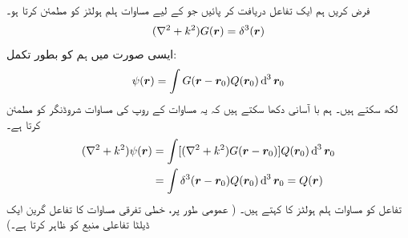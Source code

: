 فرض کریں ہم ایک تفاعل  دریافت کر پائیں جو   کے لیے مساوات ہلم ہولٹز کو مطمئن کرتا ہو۔
\begin{align}\label{مساوات_بکھراو_ہلم_ہولٹز_ڈلٹا}
	(\nabla^2+k^2)G({{\boldsymbol{r}}})=\delta^3({{\boldsymbol{r}}})
\end{align}
ایسی صورت میں ہم  کو بطور تکمل:
\begin{align}\label{مساوات_بکھراو_سائے_بطور_تکمل}
	\psi(\kvec{r})=\int G(\kvec{r}-\kvec{r}_0)Q(\kvec{r}_0)\dif^{\,3}\kvec{r}_0
\end{align}
 لکھ سکتے ہیں۔ ہم با آسانی دکھا سکتے ہیں کہ یہ مساوات  کے روپ کی مساوات شروڈنگر کو مطمئن کرتا ہے۔
\begin{align*}
(\nabla^2+k^2)\psi(\kvec{r}) &= \int[(\nabla^2+k^2)G(\kvec{r}-\kvec{r}_0)]Q(\kvec{r}_0)\dif^{\,3}\kvec{r}_0 \\
	&= \int\delta^3(\kvec{r}-\kvec{r}_0)Q(\kvec{r}_0)\dif^{\,3}\kvec{r}_0 = Q(\kvec{r})
\end{align*}
تفاعل  کو مساوات ہلم ہولٹز کا  کہتے ہیں۔ ( عمومی طور پر، خطی تفرقی مساوات کا تفاعل گرین ایک ڈیلٹا تفاعلی منبع کو  ظاہر کرتا ہے۔)

